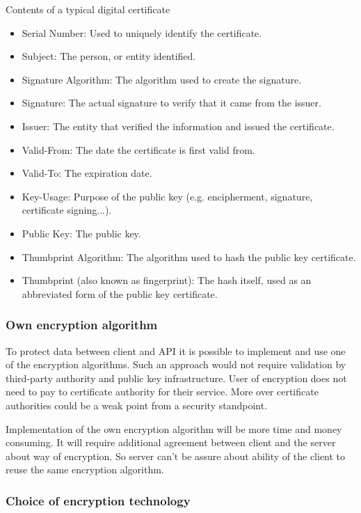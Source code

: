 \documentclass[thesis=M,english]{FITthesis}[2012/10/20]
\begin{document}
Contents of a typical digital certificate
\begin{itemize}
	\item Serial Number: Used to uniquely identify the certificate.
	\item Subject: The person, or entity identified.
	\item Signature Algorithm: The algorithm used to create the signature.
	\item Signature: The actual signature to verify that it came from the issuer.
	\item Issuer: The entity that verified the information and issued the certificate.
	\item Valid-From: The date the certificate is first valid from.
	\item Valid-To: The expiration date.
	\item Key-Usage: Purpose of the public key (e.g. encipherment, signature, certificate signing...).
	\item Public Key: The public key.
	\item Thumbprint Algorithm: The algorithm used to hash the public key certificate.
	\item Thumbprint (also known as fingerprint): The hash itself, used as an abbreviated form of the public key certificate.
\end{itemize}


\subsubsection{Own encryption algorithm}

To protect data between client and API it is possible to implement and use one of the encryption algorithms. Such an approach would not require validation by third-party authority and public key infrastructure. User of encryption does not need to pay to certificate authority for their service. More over  certificate authorities could be a weak point from a security standpoint.

Implementation of the own encryption algorithm will be more time and money consuming. It will require additional agreement between client and the server about way of encryption. So server can't be assure about ability of the client to reuse the same encryption algorithm.

\subsubsection{Choice of encryption technology}
\end{document}
